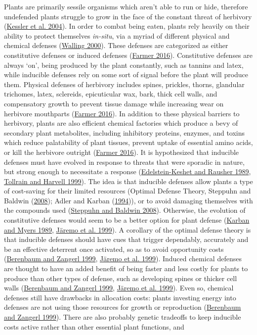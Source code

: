 \documentclass{ufdissertation}[overrideChapters] %
\begin{document}
{Plants are primarily sessile organisms which aren't able to run or hide, therefore undefended plants struggle to grow in the face of the constant threat of herbivory (\protect\hyperlink{ref-Kessler2004}{Kessler et al. 2004}). In order to combat being eaten, plants rely heavily on their ability to protect themselves \emph{in-situ}, via a myriad of different physical and chemical defenses (\protect\hyperlink{ref-Walling2000}{Walling 2000}). These defenses are categorized as either constitutive defenses or induced defenses (\protect\hyperlink{ref-Farmer2016}{Farmer 2016}). Constitutive defenses are always `on', being produced by the plant constantly, such as tannins and latex, while inducible defenses rely on some sort of signal before the plant will produce them. Physical defenses of herbivory includes spines, prickles, thorns, glandular trichomes, latex, sclereids, epicuticular wax, bark, thick cell walls, and compensatory growth to prevent tissue damage while increasing wear on herbivore mouthparts (\protect\hyperlink{ref-Farmer2016}{Farmer 2016}). In addition to these physical barriers to herbivory, plants are also efficient chemical factories which produce a bevy of secondary plant metabolites, including inhibitory proteins, enzymes, and toxins which reduce palatability of plant tissues, prevent uptake of essential amino acids, or kill the herbivore outright (\protect\hyperlink{ref-Farmer2016}{Farmer 2016}). It is hypothesized that inducible defenses must have evolved in response to threats that were sporadic in nature, but strong enough to necessitate a response (\protect\hyperlink{ref-EdelsteinKeshet1989}{Edelstein-Keshet and Rausher 1989}, \protect\hyperlink{ref-Tollrian1999}{Tollrain and Harvell 1999}). The idea is that inducible defenses allow plants a type of cost-saving for their limited resources (Optimal Defense Theory, Steppuhn and Baldwin (\protect\hyperlink{ref-Steppuhn2008}{2008}); Adler and Karban (\protect\hyperlink{ref-Adler1994}{1994})), or to avoid damaging themselves with the compounds used (\protect\hyperlink{ref-Steppuhn2008}{Steppuhn and Baldwin 2008}). Otherwise, the evolution of constitutive defenses would seem to be a better option for plant defense (\protect\hyperlink{ref-Karban1989}{Karban and Myers 1989}, \protect\hyperlink{ref-Jaeremo1999}{Järemo et al. 1999}). A corollary of the optimal defense theory is that inducible defenses should have cues that trigger dependably, accurately and be an effective deterrent once activated, so as to avoid opportunity costs (\protect\hyperlink{ref-Berenbaum1999}{Berenbaum and Zangerl 1999}, \protect\hyperlink{ref-Jaeremo1999}{Järemo et al. 1999}). Induced chemical defenses are thought to have an added benefit of being faster and less costly for plants to produce than other types of defense, such as developing spines or thicker cell walls (\protect\hyperlink{ref-Berenbaum1999}{Berenbaum and Zangerl 1999}, \protect\hyperlink{ref-Jaeremo1999}{Järemo et al. 1999}). Even so, chemical defenses still have drawbacks in allocation costs: plants investing energy into defenses are not using those resources for growth or reproduction (\protect\hyperlink{ref-Berenbaum1999}{Berenbaum and Zangerl 1999}). There are also probably genetic tradeoffs to keep inducible costs active rather than other essential plant functions, and }
\end{document}

